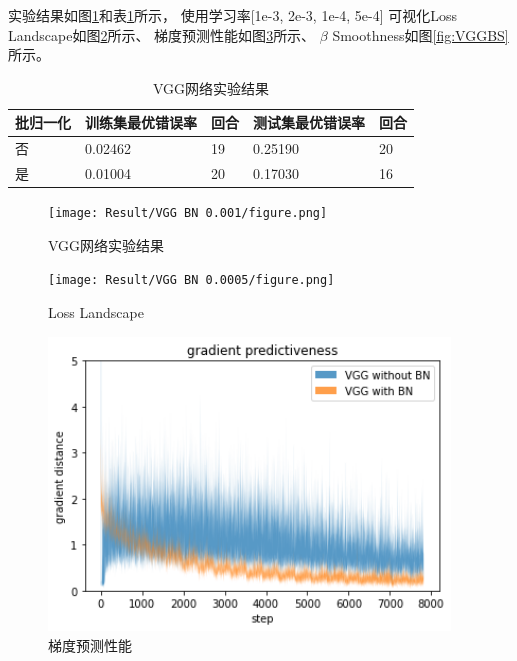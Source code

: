 \documentclass{article}
\begin{document}
实验结果如图\ref{fig:VGG}和表\ref{table:VGG}所示，
使用学习率[1e-3, 2e-3, 1e-4, 5e-4]
可视化Loss Landscape如图\ref{fig:VGGLL}所示、
梯度预测性能如图\ref{fig:VGGGP}所示、
$\beta$ Smoothness如图\ref{fig:VGGBS}所示。

\begin{table}[h]
\centering
\begin{tabular}{|l|l|l|l|l|} 
\hline
批归一化 & 训练集最优错误率 & 回合 & 测试集最优错误率 & 回合 \\
\hline
否 & 0.02462 & 19 & 0.25190 & 20 \\
是 & 0.01004 & 20 & 0.17030 & 16 \\
\hline
\end{tabular}
\caption{VGG网络实验结果}
\label{table:VGG}
\end{table}

\begin{figure}[p]
\texttt{[image: Result/VGG BN 0.001/figure.png]}
\caption{VGG网络实验结果}
\label{fig:VGG}
\end{figure}

\begin{figure}[p]
\texttt{[image: Result/VGG BN 0.0005/figure.png]}
\caption{Loss Landscape}
\label{fig:VGGLL}
\end{figure}

\begin{figure}[p]
\centering
\includegraphics[width=0.95\textwidth]
{Result/Gradient Predictiveness.png}
\caption{梯度预测性能}
\label{fig:VGGGP}
\end{figure}
\end{document}
